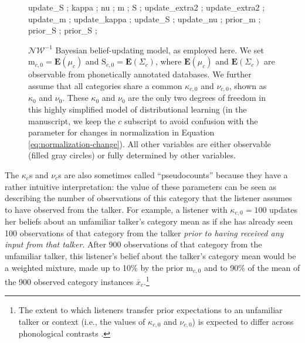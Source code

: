\documentclass[
  11pt,
  man,floatsintext]{apa6}
\begin{document}
\begin{figure}
{     {update_S} ; %
     {kappa} ; %
     {nu} ; %
     {m} ; %
     {S} ; %
     {update_extra2} ; %
     {update_extra2} ; %
     {update_m} ; %
     {update_kappa} ; %
     {update_S} ; %
     {update_nu} ; %
     {prior_m} ;
     {prior_S} ;
     {prior_S} ;
  }
  \caption{$\mathcal{NW}^{-1}$ Bayesian belief-updating model, as employed here. We set $\mathrm{m}_{c,0} = \mathbf{E}(\mu_c)$ and $\mathrm{S}_{c,0}=\mathbf{E}(\Sigma_c)$, where $\mathbf{E}(\mu_c)$ and $\mathbf{E}(\Sigma_c)$ are observable from phonetically annotated databases. We further assume that all categories share a common $\kappa_{c,0}$ and $\nu_{c,0}$, shown as $\kappa_{0}$ and $\nu_{0}$. These $\kappa_{0}$ and $\nu_{0}$ are the only two degrees of freedom in this highly simplified model of distributional learning (in the manuscript, we keep the $c$ subscript to avoid confusion with the parameter for changes in normalization in Equation \ref{eq:normalization-change}). All other variables are either observable (filled gray circles) or fully determined by other variables.}\label{fig:model-belief-updating}
\end{figure}

The \(\kappa_{c}\)s and \(\nu_{c}\)s are also sometimes called ``pseudocounts'' because they have a rather intuitive interpretation: the value of these parameters can be seen as describing the number of observations of this category that the listener assumes to have observed from the talker. For example, a listener with \(\kappa_{c,0} = 100\) updates her beliefs about an unfamiliar talker's category mean as if she has already seen 100 observations of that category from the talker \emph{prior to having received any input from that talker}. After 900 observations of that category from the unfamiliar talker, this listener's belief about the talker's category mean would be a weighted mixture, made up to 10\% by the prior \(\mathrm{m}_{c,0}\) and to 90\% of the mean of the 900 observed category instances \(\bar{x}_c\).\footnote{The extent to which listeners transfer prior expectations to an unfamiliar talker or context (i.e., the values of \(\kappa_{c,0}\) and \(\nu_{c,0}\)) is expected to differ across phonological contrasts \autocite[see discussion in][]{kleinschmidt-jaeger2015}.}
\end{document}
